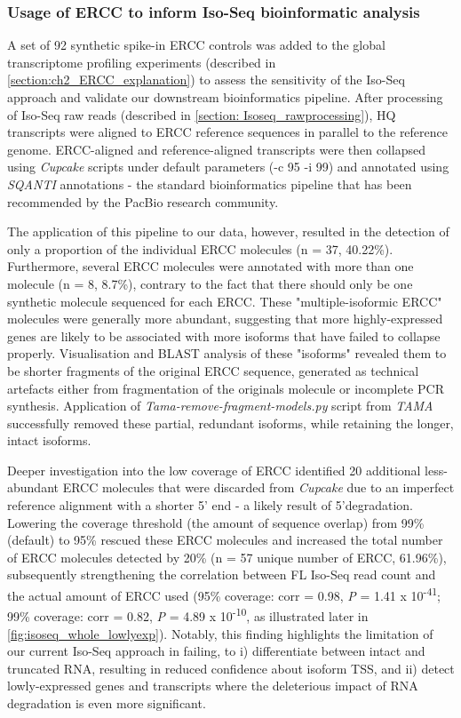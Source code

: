 \newpage
\subsubsection{Usage of ERCC to inform Iso-Seq bioinformatic analysis}
A set of 92 synthetic spike-in ERCC controls was added to the global transcriptome profiling experiments (described in \cref{section:ch2_ERCC_explanation}) to assess the sensitivity of the Iso-Seq approach and validate our downstream bioinformatics pipeline. After processing of Iso-Seq raw reads (described in \cref{section: Isoseq_rawprocessing}), HQ transcripts were aligned to ERCC reference sequences in parallel to the reference genome. ERCC-aligned and reference-aligned transcripts were then collapsed using \textit{Cupcake} scripts under default parameters (-c 95 -i 99) and annotated using \textit{SQANTI} annotations - the standard bioinformatics pipeline that has been recommended by the PacBio research community. 

The application of this pipeline to our data, however, resulted in the detection of only a proportion of the individual ERCC molecules (n = 37, 40.22\%). Furthermore, several ERCC molecules were annotated with more than one molecule (n = 8, 8.7\%), contrary to the fact that there should only be one synthetic molecule sequenced for each ERCC. These "multiple-isoformic ERCC" molecules were generally more abundant, suggesting that more highly-expressed genes are likely to be associated with more isoforms that have failed to collapse properly. Visualisation and BLAST analysis of these "isoforms" revealed them to be shorter fragments of the original ERCC sequence, generated as technical artefacts either from fragmentation of the originals molecule or incomplete PCR synthesis. Application of \textit{Tama-remove-fragment-models.py} script from \textit{TAMA}\cite{Kuo2017} successfully removed these partial, redundant isoforms, while retaining the longer, intact isoforms. 

Deeper investigation into the low coverage of ERCC identified  20 additional less-abundant ERCC molecules that were 
discarded from \textit{Cupcake} due to an imperfect reference alignment with a shorter 5' end - a likely result of 5'degradation. Lowering the coverage threshold (the amount of sequence overlap) from 99\% (default) to 95\% rescued these ERCC molecules and increased the total number of ERCC molecules detected by 20\% (n = 57 unique number of ERCC, 61.96\%), subsequently strengthening the correlation between FL Iso-Seq read count and the actual amount of ERCC used (95\% coverage: corr = 0.98, \textit{P} = 1.41 x 10\textsuperscript{-41}; 99\% coverage: corr = 0.82, \textit{P} = 4.89 x 10\textsuperscript{-10}, as illustrated later in \cref{fig:isoseq_whole_lowlyexp}). Notably, this finding highlights the limitation of our current Iso-Seq approach in failing, to i) differentiate between intact and truncated RNA, resulting in reduced confidence about isoform TSS, and ii) detect lowly-expressed genes and transcripts where the deleterious impact of RNA degradation is even more significant. 
